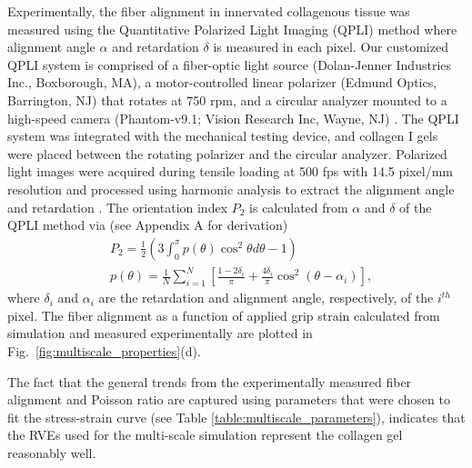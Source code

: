 \documentclass[]{interact}
\begin{document}
Experimentally, the fiber alignment in innervated collagenous tissue was measured using the Quantitative Polarized Light Imaging (QPLI) method \citep{Quinn:2008df,Quinn:2009bf} where alignment angle $\alpha$ and retardation $\delta$ is measured in each pixel. Our customized QPLI system \citep{Zhang:2016ga} is comprised of a fiber-optic light source (Dolan-Jenner Industries Inc., Boxborough, MA), a motor-controlled linear polarizer (Edmund Optics, Barrington, NJ) that rotates at 750 rpm, and a circular analyzer mounted to a high-speed camera (Phantom-v9.1; Vision Research Inc, Wayne, NJ) \citep{Zhang:2016ga}. The QPLI system was integrated with the mechanical testing device, and collagen I gels were placed between the rotating polarizer and the circular analyzer. Polarized light images were acquired during tensile loading at 500 fps with 14.5 pixel/mm resolution and processed using harmonic analysis to extract the alignment angle and retardation \citep{Tower:2002hk,Quinn:2008df}. The orientation index $P_2$ is calculated from $\alpha$ and $\delta$ of the QPLI method via (see Appendix A for derivation)
%
\begin{align}
&P_2 = \frac{1}{2}\left(3 \int_0^{\pi} p(\theta) \cos^2\theta d\theta - 1\right) \nonumber\\
&p(\theta) = \frac{1}{N} \sum_{i=1}^N \left[ \frac{1-2\delta_i}{\pi} + \frac{4 \delta_i}{\pi}\cos^2(\theta - \alpha_i)\right],
\label{eq:P2_experiment}
\end{align}
%
where $\delta_i$ and $\alpha_i$ are the retardation and alignment angle, respectively, of the $i^{th}$ pixel. The fiber alignment as a function of applied grip strain calculated from simulation and measured experimentally are plotted in Fig.\ \ref{fig:multiscale_properties}(d). 

The fact that the general trends from the experimentally measured fiber alignment and Poisson ratio are captured using parameters that were chosen to fit the stress-strain curve (see Table \ref{table:multiscale_parameters}), indicates that the RVEs used for the multi-scale simulation represent the collagen gel reasonably well. 

\end{document}
